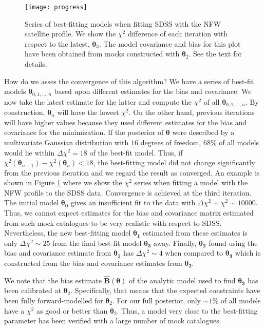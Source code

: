 \documentclass[fleqn,usenatbib,useAMS]{mnras}
\begin{document}
\begin{figure}
	\centering
	\texttt{[image: progress]}
	\caption{Series of best-fitting models when fitting SDSS with the NFW satellite profile. We show the $\chi^2$ difference of each iteration with respect to the latest, $\boldsymbol{\theta}_3$. The model covariance and bias for this plot have been obtained from mocks constructed with $\boldsymbol{\theta}_2$. See the text for details.}
	\label{fig:convergence}
\end{figure}

How do we asses the convergence of this algorithm? We have a series of best-fit models $\boldsymbol{\theta}_{0,1,...,n}$ based upon different estimates for the bias and covariance. We now take the latest estimate for the latter and compute the $\chi^2$ of all $\boldsymbol{\theta}_{0,1,...,n}$. By construction, $\boldsymbol{\theta}_n$ will have the lowest $\chi^2$. On the other hand, previous iterations will have higher values because they used different estimates for the bias and covariance for the minimization. If the posterior of $\boldsymbol{\theta}$ were described by a multivariate Gaussian distribution with $16$ degrees of freedom, $68\%$ of all models would lie within $\Delta \chi^2 = 18$ of the best-fit model. Thus, if $\chi^2 \left(\boldsymbol{\theta}_{n - 1} \right) - \chi^2 \left( \boldsymbol{\theta}_n \right) < 18$, the best-fitting model did not change significantly from the previous iteration and we regard the result as converged. An example is shown in Figure \ref{fig:convergence} where we show the $\chi^2$ series when fitting a model with the NFW profile to the SDSS data. Convergence is achieved at the third iteration. The initial model $\boldsymbol{\theta_0}$ gives an insufficient fit to the data with $\Delta \chi^2 \sim \chi^2 \sim 10000$. Thus, we cannot expect estimates for the bias and covariance matrix estimated from such mock catalogues to be very realistic with respect to SDSS. Nevertheless, the new best-fitting model $\boldsymbol{\theta_1}$ estimated from these estimates is only $\Delta \chi^2 \sim 25$  from the final best-fit model $\boldsymbol{\theta_3}$ away. Finally, $\boldsymbol{\theta_2}$ found using the bias and covariance estimate from $\boldsymbol{\theta_1}$ has $\Delta \chi^2 \sim 4$  when compared to $\boldsymbol{\theta_3}$ which is constructed from the bias and covariance estimates from $\boldsymbol{\theta_2}$.

We note that the bias estimate $\boldsymbol{\hat{B}}(\boldsymbol{\theta})$ of the analytic model used to find $\boldsymbol{\theta_3}$ has been calibrated at $\boldsymbol{\theta}_2$. Specifically, that means that the expected constraints have been fully forward-modelled for $\boldsymbol{\theta}_2$. For our full posterior, only $\sim 1\%$  of all models have a $\chi^2$ as good or better than $\boldsymbol{\theta}_2$. Thus, a model very close to the best-fitting parameter has been verified with a large number of mock catalogues.
\end{document}
